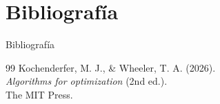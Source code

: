 \section{Bibliografía}

\begin{frame}{Bibliografía}
    \begin{thebibliography}{99}
        Kochenderfer, M. J., \& Wheeler, T. A. (2026). \\
        \textit{Algorithms for optimization} (2nd ed.). \\
        The MIT Press.
    \end{thebibliography}
\end{frame}